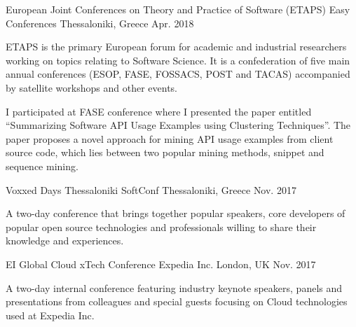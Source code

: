 

\begin{cventries}


  \cventry
    {European Joint Conferences on Theory and Practice of Software  (ETAPS)} %
    {Easy Conferences} %
    {Thessaloniki, Greece} %
    {Apr. 2018} %
    {
      \begin{cvitems} %
        \item {ETAPS is the primary European forum for academic and industrial researchers working on topics relating to Software Science. It is a confederation of five main annual conferences (ESOP, FASE, FOSSACS, POST and TACAS) accompanied by satellite workshops and other events.}
        \item {I participated at FASE conference where I presented the paper entitled ``Summarizing Software API Usage Examples using Clustering Techniques''. The paper proposes a novel approach for mining API usage examples from client source code, which lies between two popular mining methods, snippet and sequence mining.}
      \end{cvitems}
    }

  \cventry
    {Voxxed Days Thessaloniki} %
    {SoftConf} %
    {Thessaloniki, Greece} %
    {Nov. 2017} %
    {
      \begin{cvitems} %
        \item {A two-day conference that brings together popular speakers, core developers of popular open source technologies and professionals willing to share their knowledge and experiences.}
      \end{cvitems}
    }
    
   \cventry
    {EI Global Cloud xTech Conference} %
    {Expedia Inc.} %
    {London, UK} %
    {Nov. 2017} %
    {
      \begin{cvitems} %
        \item {A two-day internal conference featuring industry keynote speakers, panels and presentations from colleagues and special guests focusing on Cloud technologies used at Expedia Inc.}
      \end{cvitems}
    }


\end{cventries}
